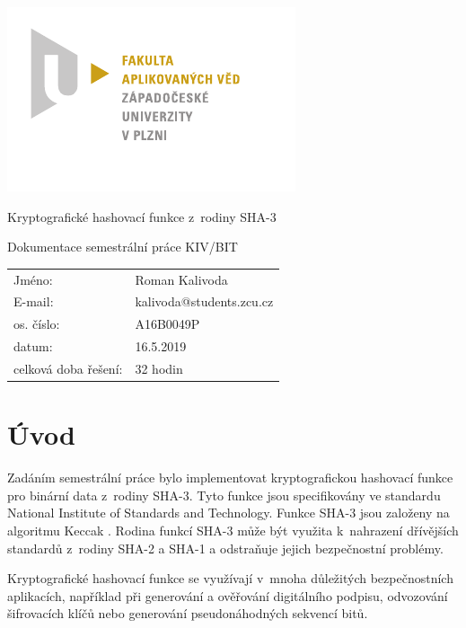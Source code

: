 \documentclass[titlepage,a4paper,12pt]{article}
\begin{document}

\begin{titlepage}
\centering
\includegraphics[scale=1.3]{logo.pdf}\par\vspace{1cm}
{\Huge Kryptografické hashovací funkce z~rodiny SHA-3 \par}
{\LARGE Dokumentace semestrální práce KIV/BIT \par}
\vfill

\centering
\begin{tabular}{ll}
    Jméno: & Roman Kalivoda \\
    E-mail: & kalivoda@students.zcu.cz \\
    os. číslo: & A16B0049P \\
    datum: & 16.5.2019 \\
    celková doba řešení: & 32 hodin
\end{tabular}
\end{titlepage}

\tableofcontents\thispagestyle{empty}\setcounter{page}{0}\newpage

\section{Úvod}

Zadáním semestrální práce bylo implementovat kryptografickou hashovací funkce pro binární data z~rodiny SHA-3. Tyto funkce jsou specifikovány ve standardu \cite{dworkin2015sha} National Institute of Standards and Technology. Funkce SHA-3 jsou založeny na algoritmu Keccak \cite{keccak_team}. Rodina funkcí SHA-3 může být využita k~nahrazení dřívějších standardů z~rodiny SHA-2 a SHA-1 a odstraňuje jejich bezpečnostní problémy. \par
Kryptografické hashovací funkce se využívají v~mnoha důležitých bezpečnostních aplikacích, například při generování a ověřování digitálního podpisu, odvozování šifrovacích klíčů nebo generování pseudonáhodných sekvencí bitů.
\end{document}
